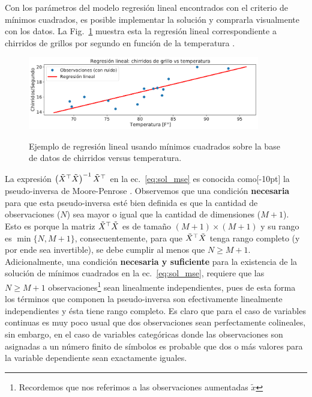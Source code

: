 Con los parámetros del modelo regresión lineal encontrados con el criterio de mínimos cuadrados, es posible implementar la solución y comprarla visualmente con los datos. La Fig.~\ref{fig:reg_lin_1} muestra esta la regresión lineal correspondiente a chirridos de grillos por segundo en función de la temperatura \cite{insects}. 

\begin{figure}[H]
	\centering
	\includegraphics[width=0.9\textwidth]{img/cap1_chirridos.pdf}\\
	\caption{Ejemplo de regresión lineal usando mínimos cuadrados sobre la base de datos de chirridos versus temperatura.}
	\label{fig:reg_lin_1}
\end{figure}

La expresión $\left(\tilde{X}^\top\tilde{X} \right)^{-1} \tilde{X}^\top$ en la ec.~\eqref{eq:sol_mse} es conocida como[-10pt] la pseudo-inversa de Moore-Penrose \cite[p.~7]{benisrael_greville_2006}. Observemos que una condición \textbf{necesaria} para que esta pseudo-inversa esté bien definida es que la cantidad de observaciones ($N$) sea mayor o igual que la cantidad de dimensiones ($M+1$). Esto es porque la matriz $\tilde{X}^\top\tilde{X}$ es de tamaño $(M+1)\times(M+1)$ y su rango es $\min \{N, M+1\}$, consecuentemente, para que $\tilde{X}^\top\tilde{X}$ tenga rango completo (y por ende sea invertible), se debe cumplir al menos que $N\geq M+1$. Adicionalmente, una condición \textbf{necesaria y suficiente}  para la existencia de la solución de mínimos cuadrados en la ec.~\eqref{eq:sol_mse}, requiere que las $N\geq M+1$ observaciones\footnote{Recordemos que nos referimos a las observaciones aumentadas $\tilde{x}$} sean linealmente independientes, pues de esta forma los términos que componen la pseudo-inversa son efectivamente linealmente independientes y ésta tiene rango completo. Es claro que para el caso de variables continuas es muy poco usual que dos observaciones sean perfectamente colineales, sin embargo, en el caso de variables categóricas donde las observaciones son asignadas a un número finito de símbolos es probable que dos o más valores para la variable dependiente sean exactamente iguales. 

